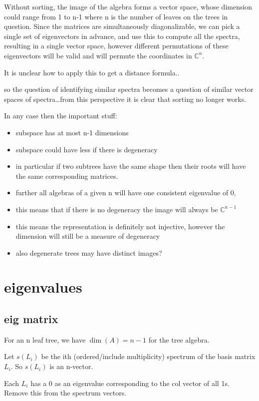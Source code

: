 \documentclass{report}
\begin{document}
Without sorting, the image of the algebra forms a vector space, whose dimension
could range from 1 to n-1 where n is the number of leaves on the trees in
question.
Since the matrices are simultaneously diagonalizable, we can pick a single set
of eigenvectors in advance, and use this to compute all the spectra, resulting
in a single vector space, however different permutations of these eigenvectors
will be valid and will permute the coordinates in $\mathds{C}^n$.

It is unclear how to apply this to get a distance formula..

so the question of identifying similar spectra becomes a question of similar
vector spaces of spectra\ldots from this perspective it is clear that sorting
no longer works.

In any case then the important stuff:
\begin{itemize}
	\item subspace has at most n-1 dimensions
	\item subspace could have less if there is degeneracy
	\item in particular if two subtrees have the same shape then their roots
		will have the same corresponding matrices.
	\item further all algebras of a given n will have one consistent
		eigenvalue of 0,
	\item this means that if there is no degeneracy the image will always be
		$\mathds{C}^{n-1}$
	\item this means the representation is definitely not injective, however
		the dimension will still be a measure of degeneracy
	\item also degenerate trees may have distinct images?
\end{itemize}

\section{eigenvalues}

\subsection{eig matrix}

For an n leaf tree, we have $\dim(A)=n-1$ for the tree algebra.

Let $s(L_i)$ be the ith (ordered/include multiplicity) spectrum of the basis
matrix $L_i$. So $s(L_i)$ is an n-vector.

Each $L_i$ has a 0 as an eigenvalue corresponding to the col vector of all 1s.
Remove this from the spectrum vectors.
\end{document}
